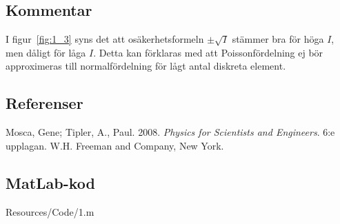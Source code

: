 \subsection*{Kommentar}
I figur~\ref{fig:1_3} syns det att osäkerhetsformeln $\pm\sqrt{I}$ stämmer bra för höga $I$, men dåligt för låga $I$. Detta kan förklaras med att Poissonfördelning ej bör approximeras till normalfördelning för lågt antal diskreta element.

\subsection*{Referenser}
Mosca, Gene; Tipler, A., Paul. 2008. \textit{Physics for Scientists and Engineers}. 6:e upplagan. W.H. Freeman and Company, New York.

\np
\subsection*{MatLab-kod}

 {Resources/Code/1.m}